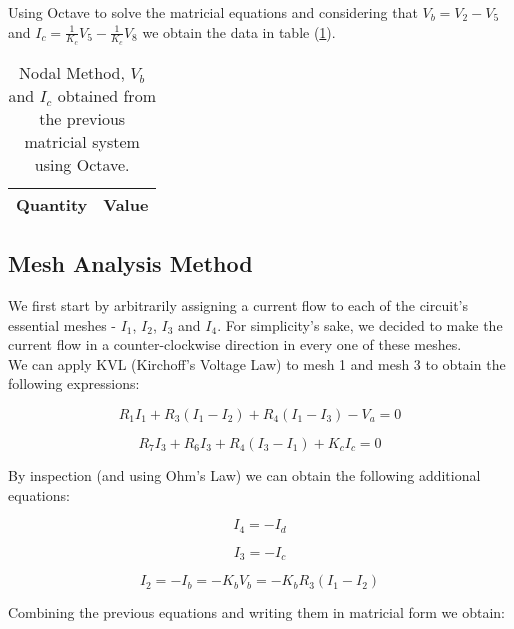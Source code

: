 Using Octave to solve the matricial equations and considering that $V_b = V_2 - V_5$ 
and $I_c = \frac{1}{K_c} V_5 - \frac{1}{K_c} V_8$ we obtain the data in table (\ref{tab:NodalMethod}).

\begin{table}[hbt!]
  \centering
  \begin{tabular}{|l|r|}
    \hline    
    {\bf Quantity} & {\bf Value} \\ \hline
    
  \end{tabular}
  \caption{Nodal Method, $V_b$ and $I_c$ obtained from the previous matricial system using Octave.}
  \label{tab:NodalMethod}
\end{table}


\subsection{Mesh Analysis Method}

We first start by arbitrarily assigning a current flow to each of the circuit's essential meshes - $I_1$, $I_2$, $I_3$ and $I_4$.
For simplicity's sake, we decided to make the current flow in a counter-clockwise direction in every one of these meshes.
\\
We can apply KVL (Kirchoff's Voltage Law) to mesh 1 and mesh 3 to obtain the following expressions:

\begin{equation}
    R_1 I_1 + R_3 (I_1 - I_2) + R_4 (I_1 - I_3) - V_a = 0
\end{equation}

\begin{equation}
    R_7 I_3 + R_6 I_3 + R_4(I_3-I_1) + K_c I_c = 0
\end{equation}

By inspection (and using Ohm's Law) we can obtain the following additional equations:

\begin{equation}
    I_4 = - I_d
\end{equation}

\begin{equation}
    I_3 = - I_c
\end{equation}

\begin{equation}
    I_2 = - I_b = - K_b V_b = - K_b R_3 (I_1 - I_2)
\end{equation}

Combining the previous equations and writing them in matricial form we obtain:


